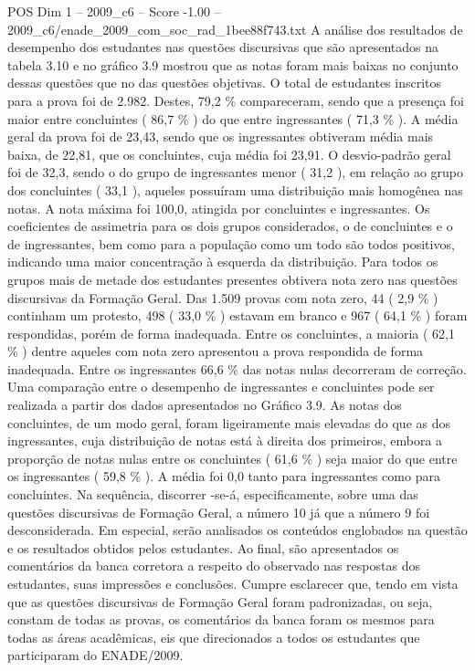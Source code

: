 \begin{textsample}{POS Dim 1 – 2009\_c6 – Score -1.00 – 2009\_c6/enade\_2009\_com\_soc\_rad\_1bee88f743.txt}
A análise dos resultados de desempenho dos estudantes nas questões discursivas que são apresentados na tabela 3.10 e no gráfico 3.9 mostrou que as notas foram mais baixas no conjunto dessas questões que no das questões objetivas.
O total de estudantes inscritos para a prova foi de 2.982.
Destes, 79,2 \% compareceram, sendo que a presença foi maior entre concluintes ( 86,7 \% ) do que entre ingressantes ( 71,3 \% ).
A média geral da prova foi de 23,43, sendo que os ingressantes obtiveram média mais baixa, de 22,81, que os concluintes, cuja média foi 23,91.
O desvio-padrão geral foi de 32,3, sendo o do grupo de ingressantes menor ( 31,2 ), em relação ao grupo dos concluintes ( 33,1 ), aqueles possuíram uma distribuição mais homogênea nas notas.
A nota máxima foi 100,0, atingida por concluintes e ingressantes.
Os coeficientes de assimetria para os dois grupos considerados, o de concluintes e o de ingressantes, bem como para a população como um todo são todos positivos, indicando uma maior concentração à esquerda da distribuição.
Para todos os grupos mais de metade dos estudantes presentes obtivera nota zero nas questões discursivas da Formação Geral.
Das 1.509 provas com nota zero, 44 ( 2,9 \% ) continham um protesto, 498 ( 33,0 \% ) estavam em branco e 967 ( 64,1 \% ) foram respondidas, porém de forma inadequada.
Entre os concluintes, a maioria ( 62,1 \% ) dentre aqueles com nota zero apresentou a prova respondida de forma inadequada.
Entre os ingressantes 66,6 \% das notas nulas decorreram de correção.
Uma comparação entre o desempenho de ingressantes e concluintes pode ser realizada a partir dos dados apresentados no Gráfico 3.9.
As notas dos concluintes, de um modo geral, foram ligeiramente mais elevadas do que as dos ingressantes, cuja distribuição de notas está à direita dos primeiros, embora a proporção de notas nulas entre os concluintes ( 61,6 \% ) seja maior do que entre os ingressantes ( 59,8 \% ).
A média foi 0,0 tanto para ingressantes como para concluintes.
Na sequência, discorrer -se-á, especificamente, sobre uma das questões discursivas de Formação Geral, a número 10 já que a número 9 foi desconsiderada.
Em especial, serão analisados os conteúdos englobados na questão e os resultados obtidos pelos estudantes.
Ao final, são apresentados os comentários da banca corretora a respeito do observado nas respostas dos estudantes, suas impressões e conclusões.
Cumpre esclarecer que, tendo em vista que as questões discursivas de Formação Geral foram padronizadas, ou seja, constam de todas as provas, os comentários da banca foram os mesmos para todas as áreas acadêmicas, eis que direcionados a todos os estudantes que participaram do ENADE/2009.

\end{textsample}
